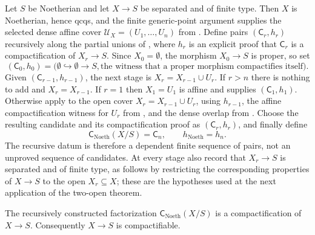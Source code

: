 \begin{definition}
  \label{def:nagata-noetherian-compactification}
  \leanok

  Let $S$ be Noetherian and let $X\to S$ be separated and of finite type.
  Then $X$ is Noetherian, hence qcqs, and the finite generic-point argument
  supplies the selected dense affine cover
  $\mathcal U_X=(U_1,\ldots,U_n)$ from
  .  Define pairs $(\mathsf C_r,h_r)$
  recursively along the partial unions of
  , where $h_r$ is an explicit proof
  that $\mathsf C_r$ is a compactification of $X_r\to S$.  Since
  $X_0=\emptyset$, the morphism $X_0\to S$ is proper, so set
  \[
    (\mathsf C_0,h_0)
      =\bigl(\emptyset\hookrightarrow\emptyset\to S,
        \text{the witness that a proper morphism compactifies itself}\bigr).
  \]
  Given $(\mathsf C_{r-1},h_{r-1})$, the next stage is $X_r=X_{r-1}\cup U_r$.
  If $r>n$ there is nothing to add and $X_r=X_{r-1}$.  If $r=1$ then
  $X_1=U_1$ is affine and
   supplies $(\mathsf C_1,h_1)$.
  Otherwise apply  to the open cover
  $X_r=X_{r-1}\cup U_r$, using $h_{r-1}$, the affine compactification witness
  for $U_r$ from , and the dense
  overlap from .  Choose the
  resulting candidate and its compactification proof as
  $(\mathsf C_r,h_r)$, and finally define
  \[
    \mathsf C_{\mathrm{Noeth}}(X/S)=\mathsf C_n,
    \qquad h_{\mathrm{Noeth}}=h_n.
  \]
  The recursive datum is therefore a dependent finite sequence of pairs, not
  an unproved sequence of candidates.  At every stage also record that
  $X_r\to S$ is separated and of finite type, as follows by restricting the
  corresponding properties of $X\to S$ to the open $X_r\subseteq X$; these
  are the hypotheses used at the next application of the two-open theorem.
\end{definition}

\begin{theorem}
  \label{thm:nagata-noetherian}
  \leanok

  The recursively constructed factorization
  $\mathsf C_{\mathrm{Noeth}}(X/S)$ is a compactification of $X\to S$.
  Consequently $X\to S$ is compactifiable.
\end{theorem}

